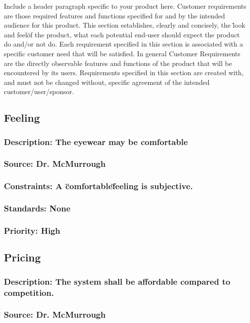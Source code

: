 Include a header paragraph specific to your product here. Customer requirements are those required features and functions specified for and by the intended audience for this product. This section establishes, clearly and concisely, the \"look and feel\" of the product, what each potential end-user should expect the product do and/or not do. Each requirement specified in this section is associated with a specific customer need that will be satisfied. In general Customer Requirements are the directly observable features and functions of the product that will be encountered by its users. Requirements specified in this section are created with, and must not be changed without, specific agreement of the intended customer/user/sponsor.

\subsection{Feeling}
\subsubsection{Description: The eyewear may be comfortable}
\subsubsection{Source: Dr. McMurrough}
\subsubsection{Constraints: A \"comfortable\" feeling is subjective.}
\subsubsection{Standards: None}
\subsubsection{Priority: High}

\subsection{Pricing}
\subsubsection{Description: The system shall be affordable compared to competition.}
\subsubsection{Source: Dr. McMurrough}

